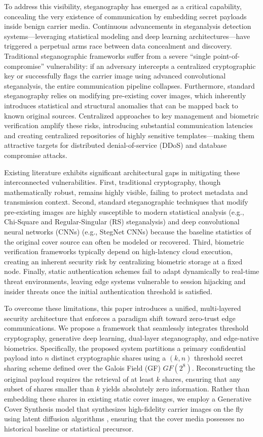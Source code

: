 \documentclass[conference]{IEEEtran}
\begin{document}
To address this visibility, steganography has emerged as a critical capability, concealing the very existence of communication by embedding secret payloads inside benign carrier media. Continuous advancements in steganalysis detection systems---leveraging statistical modeling and deep learning architectures---have triggered a perpetual arms race between data concealment and discovery. Traditional steganographic frameworks suffer from a severe ``single point-of-compromise'' vulnerability: if an adversary intercepts a centralized cryptographic key or successfully flags the carrier image using advanced convolutional steganalysis, the entire communication pipeline collapses. Furthermore, standard steganography relies on modifying pre-existing cover images, which inherently introduces statistical and structural anomalies that can be mapped back to known original sources. Centralized approaches to key management and biometric verification amplify these risks, introducing substantial communication latencies and creating centralized repositories of highly sensitive templates---making them attractive targets for distributed denial-of-service (DDoS) and database compromise attacks.

Existing literature exhibits significant architectural gaps in mitigating these interconnected vulnerabilities. First, traditional cryptography, though mathematically robust, remains highly visible, failing to protect metadata and transmission context. Second, standard steganographic techniques that modify pre-existing images are highly susceptible to modern statistical analysis (e.g., Chi-Square and Regular-Singular (RS) steganalysis) \cite{chiSquare} and deep convolutional neural networks (CNNs) (e.g., StegNet CNNs) because the baseline statistics of the original cover source can often be modeled or recovered. Third, biometric verification frameworks typically depend on high-latency cloud execution, creating an inherent security risk by centralizing biometric storage at a fixed node. Finally, static authentication schemes fail to adapt dynamically to real-time threat environments, leaving edge systems vulnerable to session hijacking and insider threats once the initial authentication threshold is satisfied.

To overcome these limitations, this paper introduces a unified, multi-layered security architecture that enforces a paradigm shift toward zero-trust edge communications. We propose a framework that seamlessly integrates threshold cryptography, generative deep learning, dual-layer steganography, and edge-native biometrics. Specifically, the proposed system partitions a primary confidential payload into $n$ distinct cryptographic shares using a $(k,n)$ threshold secret sharing scheme defined over the Galois Field (GF) $GF(2^8)$. Reconstructing the original payload requires the retrieval of at least $k$ shares, ensuring that any subset of shares smaller than $k$ yields absolutely zero information. Rather than embedding these shares in existing static cover images, we employ a Generative Cover Synthesis model that synthesizes high-fidelity carrier images on the fly using latent diffusion algorithms \cite{stegSurvey}, ensuring that the cover media possesses no historical baseline or statistical precursor.
\end{document}
